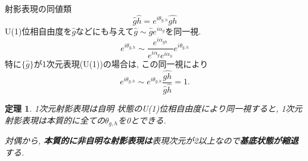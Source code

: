 \documentclass[dvipdfm]{beamer}
\newtheorem*{them}{定理}
\begin{document}
\begin{frame}{射影表現の同値類}
    \begin{equation*}
        \hat{g}\hat{h}=e^{i\theta_{g,h}}\widehat{gh}
    \end{equation*}
    U(1)位相自由度を$\hat{g}$などにも与えて$\hat{g}\sim\hat{g}e^{i\alpha_g}$を同一視.
    \begin{equation*}
        e^{i\theta_{g,h}}
        \sim
        \frac{e^{i\alpha_{gh}}}{e^{i\alpha_g}e^{i\alpha_h}}
        e^{i\theta_{g,h}}
    \end{equation*}
    特に$\{\hat{g}\}$が1次元表現(U(1))の場合は, この同一視により
    \begin{equation*}
        e^{i\theta_{g,h}}
        \sim
        e^{i\theta_{g,h}}
        \frac{\widehat{gh}}{\hat{g}\hat{h}}
        =
        1.
    \end{equation*}
    \begin{them}{1次元射影表現は自明}{}
        状態のU(1)位相自由度により同一視すると,
        1次元射影表現は本質的に全ての$\theta_{g,h}$を0とできる.

        対偶から, \textbf{\alert{本質的に非自明な射影表現は}}表現次元が2以上なので\textbf{\alert{基底状態が縮退}}する.
    \end{them}
\end{frame}


\end{document}

